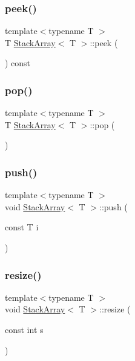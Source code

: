 \subsubsection{\texorpdfstring{peek()}{peek()}}
{\footnotesize\ttfamily template$<$typename T $>$ \\
T \mbox{\hyperlink{class_stack_array}{Stack\+Array}}$<$ T $>$\+::peek (\begin{DoxyParamCaption}{ }\end{DoxyParamCaption}) const}

\mbox{\label{class_stack_array_a22dc3218512c550170cc5aa810b039ab}} 
\subsubsection{\texorpdfstring{pop()}{pop()}}
{\footnotesize\ttfamily template$<$typename T $>$ \\
T \mbox{\hyperlink{class_stack_array}{Stack\+Array}}$<$ T $>$\+::pop (\begin{DoxyParamCaption}{ }\end{DoxyParamCaption})}

\mbox{\label{class_stack_array_a838249a39ed9e67b933620083480281f}} 
\subsubsection{\texorpdfstring{push()}{push()}}
{\footnotesize\ttfamily template$<$typename T $>$ \\
void \mbox{\hyperlink{class_stack_array}{Stack\+Array}}$<$ T $>$\+::push (\begin{DoxyParamCaption}\item[{const T}]{i }\end{DoxyParamCaption})}

\mbox{\label{class_stack_array_ac308bbdd64acd84afbacb3537bdd36a9}} 
\subsubsection{\texorpdfstring{resize()}{resize()}}
{\footnotesize\ttfamily template$<$typename T $>$ \\
void \mbox{\hyperlink{class_stack_array}{Stack\+Array}}$<$ T $>$\+::resize (\begin{DoxyParamCaption}\item[{const int}]{s }\end{DoxyParamCaption})\hspace{0.3cm}{\ttfamily [private]}}

